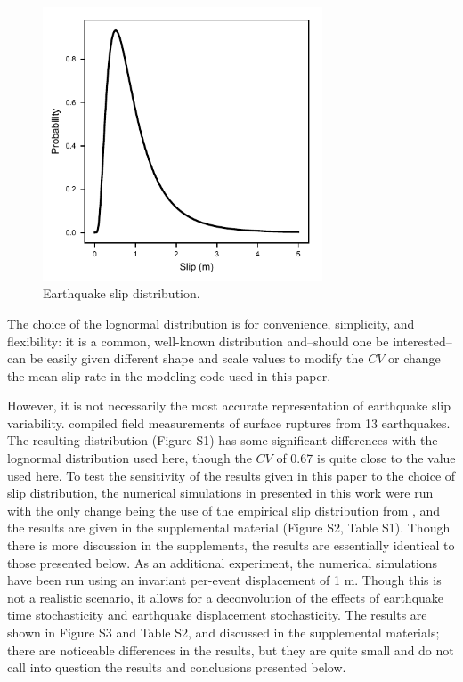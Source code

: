 \documentclass[se]{copernicus}
\begin{document}
\begin{figure}[t]
\includegraphics[width=8.3cm]{./figures/slip_dist.pdf}
\caption{Earthquake slip distribution. \label{slip_dist}}
\end{figure}

The choice of the lognormal distribution is for convenience, simplicity, and
flexibility: it is a common, well-known distribution and--should one be
interested--can be easily given different shape and scale values to modify the
\(CV\) or change the mean slip rate in the modeling code used in this paper.

However, it is not necessarily the most accurate representation of earthquake
slip variability. \citet{biasi_estimating_2006} compiled field measurements of
surface ruptures from 13 earthquakes. The resulting distribution (Figure S1) has
some significant differences with the lognormal distribution used here, though
the \(CV\) of 0.67 is quite close to the value used here. To test the
sensitivity of the results given in this paper to the choice of slip
distribution, the numerical simulations in presented in this work were run with
the only change being the use of the empirical slip distribution from 
\citet{biasi_estimating_2006}, and the results are given in the supplemental 
material (Figure S2, Table S1). Though there is more discussion in the 
supplements, the results are essentially identical to those presented below. As 
an additional experiment, the numerical simulations have been run using an 
invariant per-event displacement of 1 m. Though this is not a realistic 
scenario, it allows for a deconvolution of the effects of earthquake time 
stochasticity and earthquake displacement stochasticity. The results are shown 
in Figure S3 and Table S2, and discussed in the supplemental materials; there 
are noticeable differences in the results, but they are quite small and do not 
call into question the results and conclusions presented below.
\end{document}
